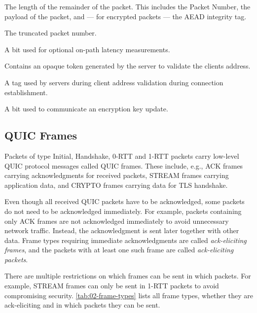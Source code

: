 \begin{description}
     The length of the remainder
    of the packet. This includes the Packet Number, the payload of the packet, and --- for encrypted
    packets --- the AEAD integrity tag.

     The truncated packet
    number.

     A bit used for optional on-path latency measurements.

     Contains an opaque token generated by the server to validate the clients address.

     A tag used by servers during client
    address validation during connection establishment.

     A bit used to communicate an encryption key update.

\end{description}

\subsection{QUIC Frames}

Packets of type Initial, Handshake, 0-RTT and 1-RTT packets carry low-level QUIC protocol messages
called QUIC frames. These include, e.g., ACK frames carrying acknowledgments for received packets,
STREAM frames carrying application data, and CRYPTO frames carrying data for TLS handshake.

Even though all received QUIC packets have to be acknowledged, some packets do not need to be
acknowledged immediately. For example, packets containing only ACK frames are not acknowledged
immediately to avoid unnecessary network traffic. Instead, the acknowledgment is sent later together
with other data. Frame types requiring immediate acknowledgments are called \textit{ack-eliciting
frames}, and the packets with at least one such frame are called \textit{ack-eliciting packets}.

There are multiple restrictions on which frames can be sent in which packets. For example, STREAM
frames can only be sent in 1-RTT packets to avoid compromising security.
\autoref{tab:02-frame-types} lists all frame types, whether they are ack-eliciting and in which
packets they can be sent.

